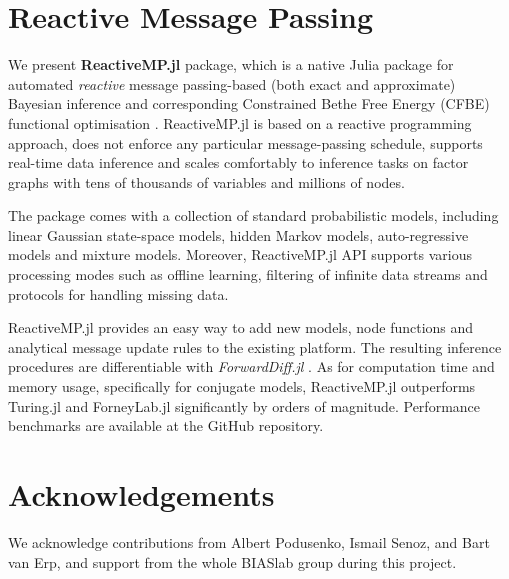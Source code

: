 \documentclass{juliacon}
\begin{document}
\section{Reactive Message Passing}

We present \textbf{ReactiveMP.jl} package, which is a native Julia \cite{bezanson2017julia} package for automated \textit{reactive} message passing-based (both exact and approximate) Bayesian inference and corresponding
Constrained Bethe Free Energy (CFBE) functional optimisation \cite{senoz_local_constraint_2021}. ReactiveMP.jl is based on a reactive programming approach, does not enforce any particular message-passing schedule, 
supports real-time data inference and scales comfortably to inference tasks on factor graphs with tens of thousands of variables and millions of nodes.

The package comes with a collection of standard probabilistic models, including linear Gaussian state-space models, hidden Markov models, auto-regressive models and mixture models. 
Moreover, ReactiveMP.jl API supports various processing modes such as offline learning, filtering of infinite data streams and protocols for handling missing data.

ReactiveMP.jl provides an easy way to add new models, node functions and analytical message update rules to the existing platform. 
The resulting inference procedures are differentiable with \textit{ForwardDiff.jl} \cite{RevelsLubinPapamarkou2016}. As for computation time and memory usage, 
specifically for conjugate models, ReactiveMP.jl outperforms Turing.jl and ForneyLab.jl significantly by orders of magnitude. Performance benchmarks are available at the GitHub repository.

\section{Acknowledgements}

We acknowledge contributions from Albert Podusenko, Ismail Senoz, and Bart van Erp, and support from the whole BIASlab group during this project.


\end{document}
